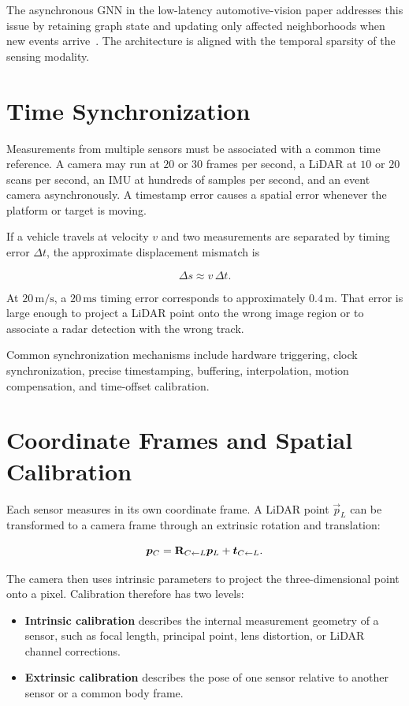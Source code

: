 The asynchronous GNN in the low-latency automotive-vision paper addresses this issue by retaining graph state and updating only affected neighborhoods when new events arrive~\cite{gehrig2024lowlatency}. The architecture is aligned with the temporal sparsity of the sensing modality.

\section{Time Synchronization}

Measurements from multiple sensors must be associated with a common time reference. A camera may run at \(20\) or \(30\) frames per second, a LiDAR at \(10\) or \(20\) scans per second, an IMU at hundreds of samples per second, and an event camera asynchronously. A timestamp error causes a spatial error whenever the platform or target is moving.

If a vehicle travels at velocity \(v\) and two measurements are separated by timing error \(\Delta t\), the approximate displacement mismatch is

\[
    \Delta s \approx v\,\Delta t.
\]

At \(20\,\mathrm{m/s}\), a \(20\,\mathrm{ms}\) timing error corresponds to approximately \(0.4\,\mathrm{m}\). That error is large enough to project a LiDAR point onto the wrong image region or to associate a radar detection with the wrong track.

Common synchronization mechanisms include hardware triggering, clock synchronization, precise timestamping, buffering, interpolation, motion compensation, and time-offset calibration.

\section{Coordinate Frames and Spatial Calibration}

Each sensor measures in its own coordinate frame. A LiDAR point \(\vec{p}_L\) can be transformed to a camera frame through an extrinsic rotation and translation:

\[
    \bm{p}_C = \mathbf{R}_{C\leftarrow L}\bm{p}_L + \bm{t}_{C\leftarrow L}.
\]

The camera then uses intrinsic parameters to project the three-dimensional point onto a pixel. Calibration therefore has two levels:

\begin{itemize}
    \item \textbf{Intrinsic calibration} describes the internal measurement geometry of a sensor, such as focal length, principal point, lens distortion, or LiDAR channel corrections.
    \item \textbf{Extrinsic calibration} describes the pose of one sensor relative to another sensor or a common body frame.
\end{itemize}

